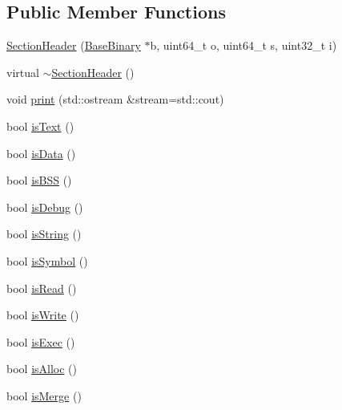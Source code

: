 \subsection*{\-Public \-Member \-Functions}
\begin{DoxyCompactItemize}
\item 
\hyperlink{class_e_p_a_x_1_1_elf_1_1_section_header_a54cc02de71e0399deb189afa5261f69a}{\-Section\-Header} (\hyperlink{class_e_p_a_x_1_1_base_binary}{\-Base\-Binary} $\ast$b, uint64\-\_\-t o, uint64\-\_\-t s, uint32\-\_\-t i)
\item 
virtual \hyperlink{class_e_p_a_x_1_1_elf_1_1_section_header_a6e422772b689a748bd07d9e432419b72}{$\sim$\-Section\-Header} ()
\item 
void \hyperlink{class_e_p_a_x_1_1_elf_1_1_section_header_a52fc6666a33be6852fbcc6894cc3d655}{print} (std\-::ostream \&stream=std\-::cout)
\item 
bool \hyperlink{class_e_p_a_x_1_1_elf_1_1_section_header_adf62f9619c5cdbe66524f864db451e26}{is\-Text} ()
\item 
bool \hyperlink{class_e_p_a_x_1_1_elf_1_1_section_header_ad554ff1dd465817c89bc817ac4e5d307}{is\-Data} ()
\item 
bool \hyperlink{class_e_p_a_x_1_1_elf_1_1_section_header_aeb485b30076f37e8ebc7c46e14c239f9}{is\-B\-S\-S} ()
\item 
bool \hyperlink{class_e_p_a_x_1_1_elf_1_1_section_header_ab1e8c09b12f6e5caef352d2eb32b7b7d}{is\-Debug} ()
\item 
bool \hyperlink{class_e_p_a_x_1_1_elf_1_1_section_header_a6d66cd345b7cb520d758ae04c50164e1}{is\-String} ()
\item 
bool \hyperlink{class_e_p_a_x_1_1_elf_1_1_section_header_a9320f92c5158659c148ee6f197b0cd70}{is\-Symbol} ()
\item 
bool \hyperlink{class_e_p_a_x_1_1_elf_1_1_section_header_ae6a3998c6af4e70913fa7bb1dd17642d}{is\-Read} ()
\item 
bool \hyperlink{class_e_p_a_x_1_1_elf_1_1_section_header_a5e33ad1689cd25b074f81397148bfd96}{is\-Write} ()
\item 
bool \hyperlink{class_e_p_a_x_1_1_elf_1_1_section_header_af6c441b3851a2311ad73a4ca3a550f33}{is\-Exec} ()
\item 
bool \hyperlink{class_e_p_a_x_1_1_elf_1_1_section_header_a31d2e329b17565b128798f80ed0779e1}{is\-Alloc} ()
\item 
bool \hyperlink{class_e_p_a_x_1_1_elf_1_1_section_header_aac6b62764b01dceae67f5fff1c966a70}{is\-Merge} ()
\item 

\end{DoxyCompactItemize}

